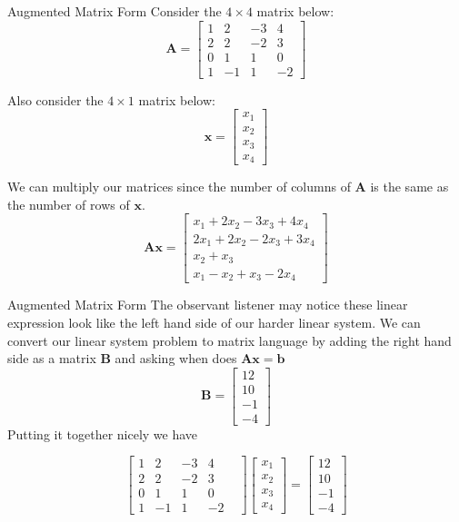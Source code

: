 \documentclass{beamer}
\begin{document}
\begin{frame}{Augmented Matrix Form}
Consider the \(4 \times 4\) matrix below:
\[
\mathbf{A} =
\begin{bmatrix}
    1 & 2 & -3 & 4 \\
    2 & 2 & -2 & 3 \\
    0 & 1 & 1 & 0 \\
    1 & -1 & 1 & -2
\end{bmatrix}
\]

Also consider the \(4 \times 1\) matrix below:
\[
\mathbf{x} =
\begin{bmatrix}
    x_1 \\
    x_2 \\
    x_3 \\
    x_4
\end{bmatrix}
\]

We can multiply our matrices since the number of columns of $\mathbf{A}$ is the same as the number of rows of $\mathbf{x}$.
\[
\mathbf{Ax} =
\begin{bmatrix}
    x_1 + 2x_2 - 3x_3 + 4x_4 \\
    2x_1 + 2x_2 - 2x_3 + 3x_4 \\
    x_2 + x_3 \\
    x_1 - x_2 + x_3 - 2x_4
\end{bmatrix}
\]
\end{frame}

\begin{frame}{Augmented Matrix Form}
The observant listener may notice these linear expression look like the left hand side of our harder linear system. We can convert our linear system problem to matrix language by adding the right hand side as a matrix $\mathbf{B}$ and asking when does $\mathbf{Ax} = \mathbf{b}$
\[
\mathbf{B} =
\begin{bmatrix}
    12 \\
    10 \\
    -1 \\
    -4
\end{bmatrix}
\]
Putting it together nicely we have

\[
\begin{bmatrix}
    1 & 2 & -3 & 4 & \\
    2 & 2 & -2 & 3 & \\
    0 & 1 & 1 & 0 & \\
    1 & -1 & 1 & -2 & 
\end{bmatrix}
\begin{bmatrix}
    x_1 \\
    x_2 \\
    x_3 \\
    x_4
\end{bmatrix}
=
\begin{bmatrix}
    12 \\
    10 \\
    -1 \\
    -4
\end{bmatrix}
\]  
\end{frame}
\end{document}

